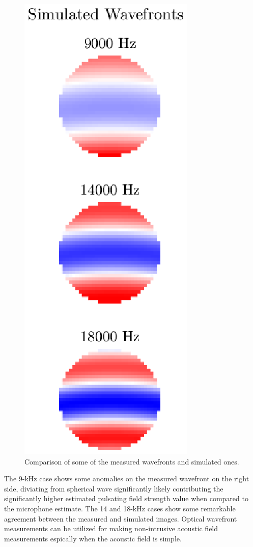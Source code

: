 \begin{figure}
  \includegraphics{../matlab/03_aero_optics_acoustics/spherical_plot_simulated.eps}
  \caption{Comparison of some of the measured wavefronts and simulated ones.}
  \label{fig:03_spherical_plot}
\end{figure}
The 9-kHz case shows some anomalies on the measured wavefront on the right side, diviating from spherical wave significantly likely contributing the significantly higher estimated pulsating field strength value when compared to the microphone estimate.
The 14 and 18-kHz cases show some remarkable agreement between the measured and simulated images.
Optical wavefront measurements can be utilized for making non-intrusive acoustic field measurements espically when the acoustic field is simple.




